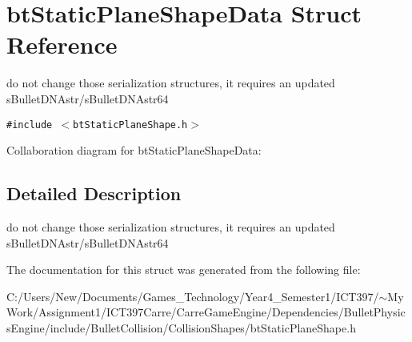\hypertarget{structbt_static_plane_shape_data}{
\section{btStaticPlaneShapeData Struct Reference}
\label{structbt_static_plane_shape_data}
}
do not change those serialization structures, it requires an updated sBulletDNAstr/sBulletDNAstr64  


{\tt \#include $<$btStaticPlaneShape.h$>$}

Collaboration diagram for btStaticPlaneShapeData:

\subsection{Detailed Description}
do not change those serialization structures, it requires an updated sBulletDNAstr/sBulletDNAstr64 

The documentation for this struct was generated from the following file:\begin{CompactItemize}
\item 
C:/Users/New/Documents/Games\_\-Technology/Year4\_\-Semester1/ICT397/$\sim$My Work/Assignment1/ICT397Carre/CarreGameEngine/Dependencies/BulletPhysicsEngine/include/BulletCollision/CollisionShapes/btStaticPlaneShape.h\end{CompactItemize}
